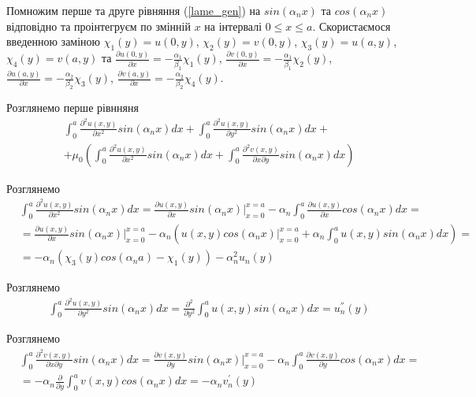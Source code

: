 Помножим перше та друге рівняння (\ref{lame_gen}) на $sin(\alpha_n x)$ та $cos(\alpha_n x)$ відповідно та проінтегруєм по змінній $x$ на інтервалі $0 \le x \le a$.
Скористаємося введенною заміною $\chi_1(y) = u(0, y)$, $\chi_2(y) = v(0, y)$, $\chi_3(y) = u(a, y)$, $\chi_4(y) = v(a, y)$ та 
$\frac{\partial u(0, y)}{\partial x}=-\frac{\alpha_1}{\beta_1} \chi_1(y)$,
$\frac{\partial v(0, y)}{\partial x}=-\frac{\alpha_1}{\beta_1} \chi_2(y)$,
$\frac{\partial u(a, y)}{\partial x}=-\frac{\alpha_2}{\beta_2} \chi_3(y)$,
$\frac{\partial v(a, y)}{\partial x}=-\frac{\alpha_2}{\beta_2} \chi_4(y)$.
\newline

Розглянемо перше рівнняня
\begin{align*}
    &\int_{0}^{a} \frac{\partial^2 u(x,y)}{\partial x^2} sin(\alpha_n x)dx + \int_{0}^{a} \frac{\partial^2 u(x,y)}{\partial y^2} sin(\alpha_n x)dx + \\ 
    & + \mu_0 \left( \int_{0}^{a} \frac{\partial^2 u(x,y)}{\partial x^2} sin(\alpha_n x)dx +  \int_{0}^{a} \frac{\partial^2 v(x,y)}{\partial x \partial y} sin(\alpha_n x) dx\right)
\end{align*}

Розглянемо
\begin{align*}
    &\int_{0}^{a} \frac{\partial^2 u(x,y)}{\partial x^2} sin(\alpha_n x)dx = \frac{\partial u(x,y)}{\partial x} sin(\alpha_n x) |_{x=0}^{x=a} - \alpha_n \int_{0}^{a} \frac{\partial u(x,y)}{\partial x} cos(\alpha_n x)dx = \\
    &= \frac{\partial u(x,y)}{\partial x} sin(\alpha_n x) |_{x=0}^{x=a} - \alpha_n \left( u(x,y) cos(\alpha_n x) |_{x=0}^{x=a} + \alpha_n \int_{0}^{a} u(x,y) sin(\alpha_n x) dx \right) = \\
    &=-\alpha_n(\chi_3(y) cos(\alpha_n a) - \chi_1(y)) -\alpha_n^2 u_n(y)
\end{align*}

Розглянемо
\begin{align*}
    &\int_{0}^{a} \frac{\partial^2 u(x,y)}{\partial y^2} sin(\alpha_n x)dx = \frac{\partial^2}{\partial y^2} \int_{0}^{a} u(x,y) sin(\alpha_n x)dx = u_n^{''}(y)
\end{align*}

Розглянемо
\begin{align*}
    &\int_{0}^{a} \frac{\partial^2 v(x,y)}{\partial x \partial y} sin(\alpha_n x) dx = \frac{\partial v(x,y)}{\partial y} sin(\alpha_n x) |_{x=0}^{x=a} - \alpha_n \int_{0}^{a} \frac{\partial v(x,y)}{\partial y} cos(\alpha_n x) dx = \\
    &= -\alpha_n \frac{\partial}{\partial y} \int_{0}^{a} v(x,y) cos(\alpha_n x) dx = -\alpha_n v_n^{'}(y)
\end{align*}

